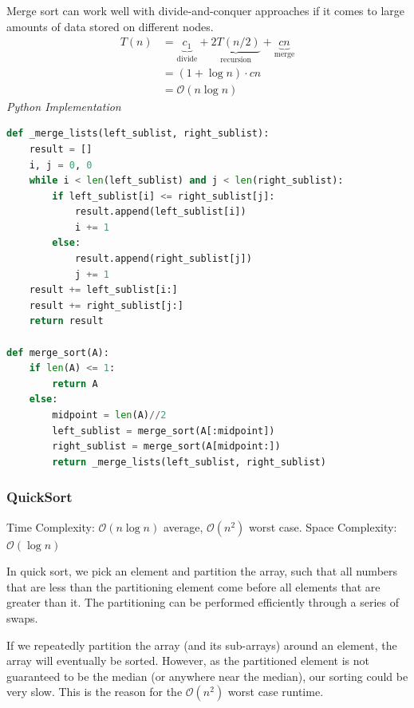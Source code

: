 \documentclass{article}
\newcommand{\bigO}{\mathcal{O}}
\begin{document}
    Merge sort can work well with divide-and-conquer approaches if it comes to large amounts of data stored on different nodes. 
    \begin{align*}
        T(n) &= 
            \underbrace{c_1}_\text{divide}
            + \underbrace{2T(n/2)}_\text{recursion}
            + \underbrace{c  n}_\text{merge}\\
        &= (1 + \log n) \cdot cn\\
        &= \bigO(n \log n)
    \end{align*}
\vspace{8pt} \emph{Python Implementation}
\begin{lstlisting}[language=Python]
def _merge_lists(left_sublist, right_sublist):
    result = []
    i, j = 0, 0
    while i < len(left_sublist) and j < len(right_sublist):
        if left_sublist[i] <= right_sublist[j]:
            result.append(left_sublist[i])
            i += 1
        else:
            result.append(right_sublist[j])
            j += 1
    result += left_sublist[i:]
    result += right_sublist[j:]
    return result

def merge_sort(A):
    if len(A) <= 1:
        return A
    else:
        midpoint = len(A)//2
        left_sublist = merge_sort(A[:midpoint])
        right_sublist = merge_sort(A[midpoint:])
        return _merge_lists(left_sublist, right_sublist)
\end{lstlisting}
    
    \subsubsection{QuickSort}
     Time Complexity: $\bigO (n \log n)$ average, $\bigO (n^2)$ worst case. Space Complexity: $\bigO (\log n )$
     
     In quick sort, we pick an element and partition the array, such that all numbers that are less than the partitioning element come before all elements that are greater than it. The partitioning can be performed efficiently through a series of swaps.

    If we repeatedly partition the array (and its sub-arrays) around an element, the array will eventually be sorted. However, as the partitioned element is not guaranteed to be the median (or anywhere near the median), our sorting could be very slow. This is the reason for the $\bigO(n^2)$ worst case runtime.
    
\end{document}
